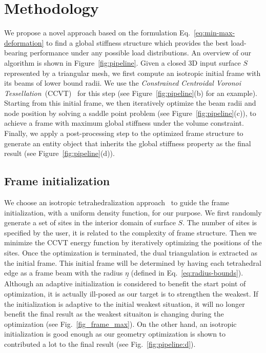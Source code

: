 \section{Methodology}
\label{sec:algorithm}


We propose a novel approach based on the formulation Eq.~\eqref{eq:min-max-deformation} to find a global stiffness structure
which provides the best load-bearing performance under any possible load distributions.
%
An overview of our algorithm is shown in Figure~\ref{fig:pipeline}.
%
Given a closed 3D input surface $S$ represented by a triangular mesh, we first compute an isotropic initial frame with its beams of lower bound radii. We use the \emph{Constrained Centroidal Voronoi Tessellation}~(CCVT)~\cite{Yan:2010} for this step (see Figure~\ref{fig:pipeline}(b) for an example).
%
Starting from this initial frame, we then iteratively optimize the beam radii and node position by solving a saddle point problem (see Figure~\ref{fig:pipeline}(c)), to achieve a frame with maximum global stiffness under the volume constraint.
%
Finally, we apply a post-processing step to the optimized frame structure to generate an entity object that inherits the global stiffness property as the final result (see Figure~\ref{fig:pipeline}(d)).


\subsection{Frame initialization}
\label{subsec:initialization}


We choose an isotropic tetrahedralization approach~\cite{Yan:2010} to guide the frame initialization, with a uniform density function, for our purpose.
We first randomly generate a set of sites in the interior domain of surface $S$.
The number of sites is specified by the user, it is related to the complexity of frame structure. Then we minimize the CCVT energy function by iteratively optimizing the positions of the sites.
Once the optimization is terminated, the dual triangulation is extracted as the initial frame.
This initial frame will be determined by having each tetrahedral edge as a frame beam with the radius $\underline{\eta}$ (defined in Eq.~\eqref{eq:radius-bounds}). Although an adaptive initialization is considered to benefit the start point of optimization, it is actually ill-posed as our target is to strengthen the weakest. If the initialization is adaptive to the initial weakest situation, it will no longer benefit the final result as the weakest situaiton is changing during the optimization (see Fig.~\ref{fig_frame_max}). On the other hand, an isotropic initialization is good enough as our geometry optimization is shown to contributed a lot to the final result (see Fig.~\ref{fig:pipeline:d}).



